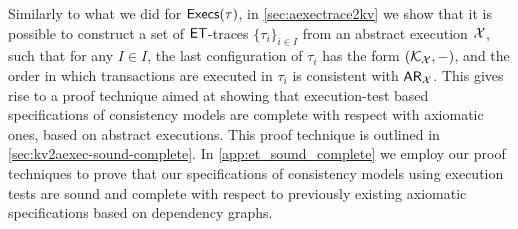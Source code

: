 Similarly to what we did for $\mathsf{Execs}(\tau)$, in \cref{sec:aexectrace2kv} we show that it is possible to 
construct a set of $\mathsf{ET}$-traces $\{\tau_{i}\}_{i \in I}$ from an abstract execution $\mathcal{X}$, such that 
for any $I \in I$, the last configuration of $\tau_{i}$ has the form $(\mathcal{K}_{\mathcal{X}}, -)$, and 
the order in which transactions are executed in $\tau_{i}$ is consistent with $\mathsf{AR}_{\mathcal{X}}$. 
This gives rise to a proof technique aimed at showing that execution-test based specifications 
of consistency models are complete with respect with axiomatic ones, based on abstract executions. 
This proof technique is outlined in \cref{sec:kv2aexec-sound-complete}. 
In \cref{app:et_sound_complete} we employ our proof techniques to prove that our specifications 
of consistency models using execution tests are sound and complete with respect to previously 
existing axiomatic specifications based on dependency graphs.
%
%
